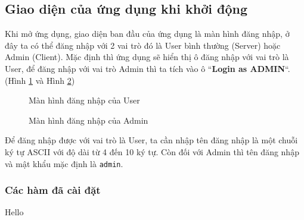 \subsection{Giao diện của ứng dụng khi khởi động}
Khi mở ứng dụng, giao diện ban đầu của ứng dụng là màn hình đăng nhập, ở đây ta có thể đăng nhập với 2 vai trò đó là User bình thường (Server) hoặc Admin (Client). Mặc định thì ứng dụng sẽ hiển thị ô đăng nhập với vai trò là User, để đăng nhập với vai trò Admin thì ta tích vào ô ``\textbf{Login as ADMIN}``. (Hình \ref{fig:ServerLogin} và Hình \ref{fig:ClientLogin})

\begin{figure}[H]
	\caption{Màn hình đăng nhập của User}
	\label{fig:ServerLogin}
\end{figure}

\begin{figure}[H]
	\caption{Màn hình đăng nhập của Admin}
	\label{fig:ClientLogin}
\end{figure}

Để đăng nhập được với vai trò là User, ta cần nhập tên đăng nhập là một chuỗi ký tự ASCII với độ dài từ 4 đến 10 ký tự. Còn đối với Admin thì tên đăng nhập và mật khẩu mặc định là \verb|admin|.
\subsubsection{Các hàm đã cài đặt}
Hello